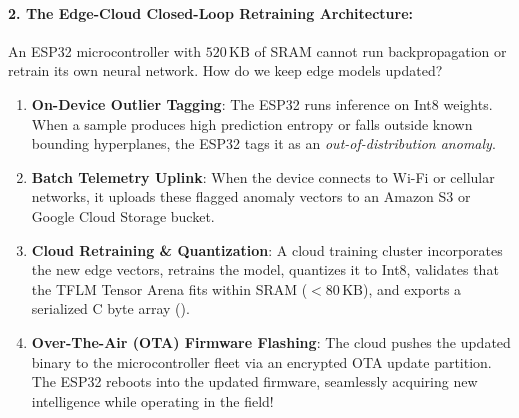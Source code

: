 \begin{iotbox}
\paragraph{2. The Edge-Cloud Closed-Loop Retraining Architecture:}
An ESP32 microcontroller with $520\,\text{KB}$ of SRAM cannot run backpropagation or retrain its own neural network. How do we keep edge models updated?
\begin{enumerate}
    \item \textbf{On-Device Outlier Tagging}: The ESP32 runs inference on Int8 weights. When a sample produces high prediction entropy or falls outside known bounding hyperplanes, the ESP32 tags it as an \emph{out-of-distribution anomaly}.
    \item \textbf{Batch Telemetry Uplink}: When the device connects to Wi-Fi or cellular networks, it uploads these flagged anomaly vectors to an Amazon S3 or Google Cloud Storage bucket.
    \item \textbf{Cloud Retraining \& Quantization}: A cloud training cluster incorporates the new edge vectors, retrains the model, quantizes it to Int8, validates that the TFLM Tensor Arena fits within SRAM ($< 80\,\text{KB}$), and exports a serialized C byte array ().
    \item \textbf{Over-The-Air (OTA) Firmware Flashing}: The cloud pushes the updated binary to the microcontroller fleet via an encrypted OTA update partition. The ESP32 reboots into the updated firmware, seamlessly acquiring new intelligence while operating in the field!
\end{enumerate}
\end{iotbox}

